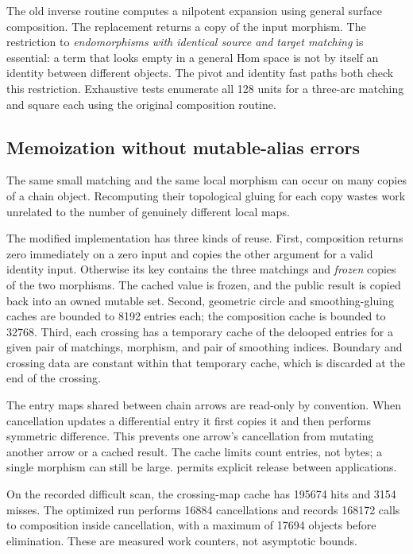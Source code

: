 \documentclass[11pt]{article}
\theoremstyle{definition}\newtheorem{definition}[theorem]{Definition}
\theoremstyle{remark}\newtheorem{remark}[theorem]{Remark}
\newcommand{\code}[1]{\texttt{\detokenize{#1}}}
\begin{document}
The old inverse routine computes a nilpotent expansion using general surface
composition. The replacement returns a copy of the input morphism. The
restriction to \emph{endomorphisms with identical source and target matching}
is essential: a term that looks empty in a general Hom space is not by itself
an identity between different objects. The pivot and identity fast paths both
check this restriction. Exhaustive tests enumerate all 128 units for a
three-arc matching and square each using the original composition routine.

\subsection{Memoization without mutable-alias errors}

The same small matching and the same local morphism can occur on many copies
of a chain object. Recomputing their topological gluing for each copy wastes
work unrelated to the number of genuinely different local maps.

The modified implementation has three kinds of reuse. First, composition
returns zero immediately on a zero input and copies the other argument for a
valid identity input. Otherwise its key contains the three matchings and
\emph{frozen} copies of the two morphisms. The cached value is frozen, and the
public result is copied back into an owned mutable set. Second, geometric
circle and smoothing-gluing caches are bounded to 8192 entries each; the
composition cache is bounded to 32768. Third, each crossing has a temporary
cache of the delooped entries for a given pair of matchings, morphism, and
pair of smoothing indices. Boundary and crossing data are constant within
that temporary cache, which is discarded at the end of the crossing.

The entry maps shared between chain arrows are read-only by convention.
When cancellation updates a differential entry it first copies it and then
performs symmetric difference. This prevents one arrow's cancellation from
mutating another arrow or a cached result. The cache limits count entries,
not bytes; a single morphism can still be large. \code{clear_caches()} permits
explicit release between applications.

On the recorded difficult scan, the crossing-map cache has 195674 hits and
3154 misses. The optimized run performs 16884 cancellations and records
168172 calls to composition inside cancellation, with a maximum of 17694
objects before elimination. These are measured work counters, not asymptotic
bounds.
\end{document}
